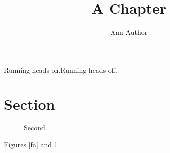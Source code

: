 \documentclass[norunningheads]{svmult}
\begin{document}
\title*{A Chapter}
\author{Ann Author}
\maketitle
\setcounter{chapter}{3}
\makeatletter\if@runhead Running heads on.\else Running heads off.\fi\makeatother
\section{Section}
\begin{figure}
\subfigures
{}\caption{First.}\label{fa}
\caption{Second.}\label{fb}
\end{figure}
Figures \ref{fa} and \ref{fb}.
\end{document}
